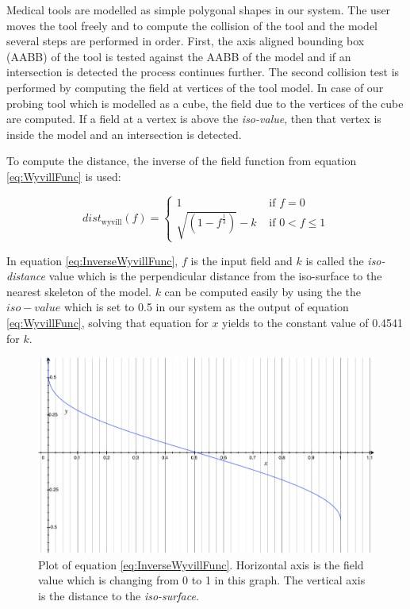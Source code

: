 Medical tools are modelled as simple polygonal shapes in our system. The user moves the tool freely 
and to compute the collision of the tool and the model several steps are performed in order. First, the 
axis aligned bounding box (AABB) of the tool is tested against the AABB of the model and if an 
intersection is detected the process continues further. The second collision 
test is performed by computing the field at vertices of the tool model. In case 
of our probing tool which is modelled as a cube, the field due to the vertices of the cube are computed. 
If a field at a vertex is above the \textit{iso-value}, then that vertex is inside the model and an intersection 
is detected.

To compute the distance, the inverse of the field function from equation \ref{eq:WyvillFunc} 
is used:

\begin{equation}
dist_\mathrm{wyvill}(f)= \left\{ \begin{array}{rl}
 1 &\mbox{ if $f = 0$} \\
\sqrt{ (1-f^\frac{1}{3}) } - k &\mbox{ if $0 < f \leq 1$}
 \end{array} \right.
\label{eq:InverseWyvillFunc}
\end{equation}

In equation \ref{eq:InverseWyvillFunc}, $f$ is the input field and $k$ is called the 
\textit{iso-distance} value which is the perpendicular distance from the iso-surface to the nearest skeleton 
of the model. $k$ can be computed easily by using the the $iso-value$ which is set to 0.5 in our system 
as the output of equation \ref{eq:WyvillFunc}, solving that equation for $x$ yields to the constant value of 
0.4541 for $k$. 


\begin{figure}[H]
  \centering
  \includegraphics[width=0.8\linewidth]{figures/deformable/distancefromfield.pdf}
  \caption{\label{fig:distancefromfield}
  {Plot of equation \ref{eq:InverseWyvillFunc}. Horizontal axis is the field value which is changing from 0 to 1
 in this graph. The vertical axis is the distance to the \textit{iso-surface}.}
}
\end{figure}

